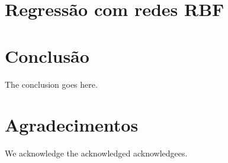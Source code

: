 \documentclass[conference]{IEEEtran}
\begin{document}
\section{Regressão com redes RBF}
\label{resultados}

\section{Conclusão}
\label{conclusao}

The conclusion goes here.

\section*{Agradecimentos}
We acknowledge the acknowledged acknowledgees.




\end{document}
